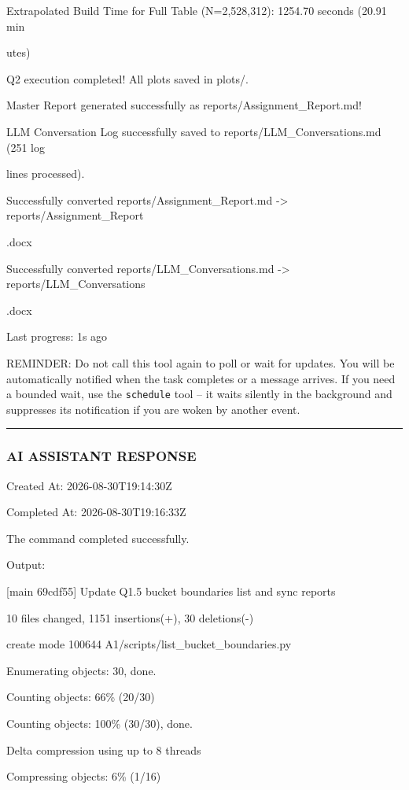 \documentclass[11pt,a4paper]{article}
\begin{document}
{Extrapolated Build Time for Full Table (N=2,528,312): 1254.70 seconds (20.91 min

utes)

Q2 execution completed! All plots saved in plots/.

Master Report generated successfully as reports/Assignment\_Report.md!

LLM Conversation Log successfully saved to reports/LLM\_Conversations.md (251 log

lines processed).

Successfully converted reports/Assignment\_Report.md -> reports/Assignment\_Report

.docx

Successfully converted reports/LLM\_Conversations.md -> reports/LLM\_Conversations

.docx


Last progress: 1s ago



REMINDER: Do not call this tool again to poll or wait for updates. You will be automatically notified when the task completes or a message arrives. If you need a bounded wait, use the \texttt{schedule} tool -- it waits silently in the background and suppresses its notification if you are woken by another event.


\hrule

\subsubsection{AI ASSISTANT RESPONSE}

Created At: 2026-08-30T19:14:30Z

Completed At: 2026-08-30T19:16:33Z


The command completed successfully.

Output:

[main 69cdf55] Update Q1.5 bucket boundaries list and sync reports

10 files changed, 1151 insertions(+), 30 deletions(-)

create mode 100644 A1/scripts/list\_bucket\_boundaries.py

Enumerating objects: 30, done.

Counting objects:  66\% (20/30)

Counting objects: 100\% (30/30), done.

Delta compression using up to 8 threads

Compressing objects:   6\% (1/16)

}
\end{document}
